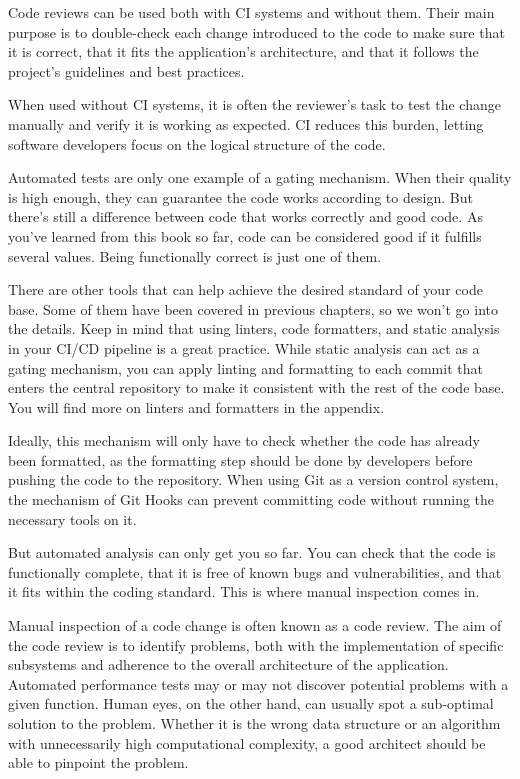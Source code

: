 
Code reviews can be used both with CI systems and without them. Their main purpose is to double-check each change introduced to the code to make sure that it is correct, that it fits the application's architecture, and that it follows the project's guidelines and best practices.

When used without CI systems, it is often the reviewer's task to test the change manually and verify it is working as expected. CI reduces this burden, letting software developers focus on the logical structure of the code.


Automated tests are only one example of a gating mechanism. When their quality is high enough, they can guarantee the code works according to design. But there's still a difference between code that works correctly and good code. As you've learned from this book so far, code can be considered good if it fulfills several values. Being functionally correct is just one of them.

There are other tools that can help achieve the desired standard of your code base. Some of them have been covered in previous chapters, so we won't go into the details. Keep in mind that using linters, code formatters, and static analysis in your CI/CD pipeline is a great practice. While static analysis can act as a gating mechanism, you can apply linting and formatting to each commit that enters the central repository to make it consistent with the rest of the code base. You will find more on linters and formatters in the appendix.

Ideally, this mechanism will only have to check whether the code has already been formatted, as the formatting step should be done by developers before pushing the code to the repository. When using Git as a version control system, the mechanism of Git Hooks can prevent committing code without running the necessary tools on it.

But automated analysis can only get you so far. You can check that the code is functionally complete, that it is free of known bugs and vulnerabilities, and that it fits within the coding standard. This is where manual inspection comes in.


Manual inspection of a code change is often known as a code review. The aim of the code review is to identify problems, both with the implementation of specific subsystems and adherence to the overall architecture of the application. Automated performance tests may or may not discover potential problems with a given function. Human eyes, on the other hand, can usually spot a sub-optimal solution to the problem. Whether it is the wrong data structure or an algorithm with unnecessarily high computational complexity, a good architect should be able to pinpoint the problem.

